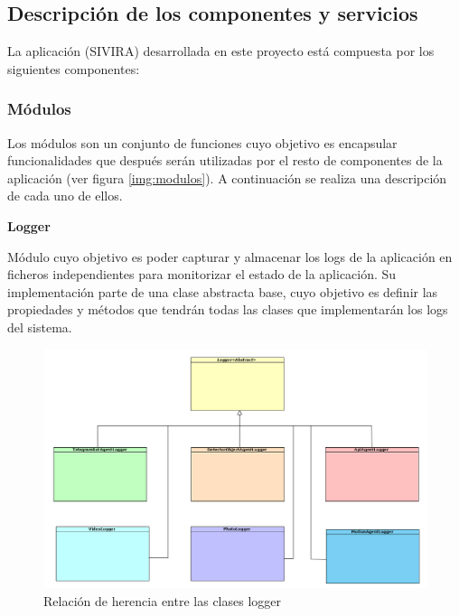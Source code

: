 


\pagestyle{miEstilo502}


\subsection{Descripción de los componentes y servicios} \label{sec:composer}

La aplicación (SIVIRA) desarrollada en este proyecto está compuesta por los siguientes componentes:

\subsubsection{Módulos}

Los módulos son un conjunto de funciones cuyo objetivo es encapsular funcionalidades que después serán utilizadas por el resto de componentes de la aplicación (ver figura \ref{img:modulos}). A continuación se realiza una descripción de cada uno de ellos.

\textbf{Logger}

Módulo cuyo objetivo es poder capturar y almacenar los logs de la aplicación en ficheros independientes para monitorizar el estado de la aplicación. Su implementación parte de una clase abstracta base, cuyo objetivo es definir las propiedades y métodos que tendrán todas las clases que implementarán los logs del sistema. 

\begin{figure}[h]
	\centering
	\includegraphics[scale=0.45]{images/83}
	\caption{Relación de herencia entre las clases logger}
\end{figure}

